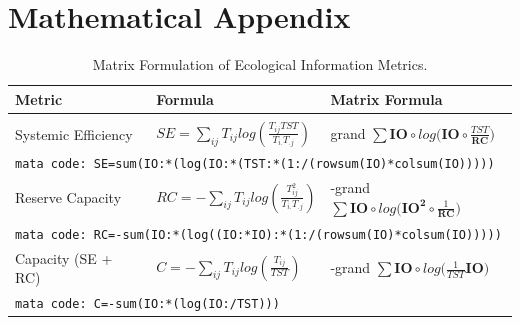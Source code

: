 \documentclass{article}
\begin{document}
\section*{Mathematical Appendix}
\begin{table}[H]
\caption{Matrix Formulation of Ecological Information Metrics.}
\label{IOmetrics_matrix}
\vskip 0.15in
\begin{sc}
\begin{center}
\begin{tabular}{ l l l }
\hline

Metric &  Formula & Matrix Formula \\
\hline
& & \\
Systemic Efficiency
  & $SE = \displaystyle\sum_{ij}{T_{ij}}
  log(\frac{T_{ij}TST}{T_{i.}T_{.j}}) $ 
  & grand $\displaystyle\sum  \mathbf{IO} \circ 
  log\bigg(\mathbf{IO} \circ  \frac{TST}{\mathbf{R}\mathbf{C}}
  \bigg)$ \\[.25in]
  
  \multicolumn{3}{l}{\hspace{.5in} \texttt{mata code:
  SE=sum(IO:*(log(IO:*(TST:*(1:/(rowsum(IO)*colsum(IO)))))}} \\[.5in]

Reserve Capacity 
  & $RC = - \displaystyle\sum_{ij}{T_{ij}} log(\frac{T_{ij}^2}{T_{i.}T_{.j}}) $ 
  & -grand $\displaystyle\sum  \mathbf{IO} \circ 
  log\bigg(\mathbf{IO^2} \circ  \frac{1}{\mathbf{R} \mathbf{C}} \bigg)$ \\[.25in]
  
\multicolumn{3}{l}{\hspace{.5in} \texttt{mata code:
  RC=-sum(IO:*(log((IO:*IO):*(1:/(rowsum(IO)*colsum(IO)))))}} \\[.5in]
  
Capacity (SE + RC)
  & $C = -\displaystyle\sum_{ij}{T_{ij}} log(\frac{T_{ij}}{TST}) $ 
  & -grand $\displaystyle\sum  \mathbf{IO} \circ 
  log\bigg(\frac{1}{TST} \mathbf{IO}\bigg)$ \\[.25in]
  
\multicolumn{3}{l}{\hspace{.5in} \texttt{mata code:
  C=-sum(IO:*(log(IO:/TST)))}} \\[.5in]
  
\end{tabular}
\end{center}
\end{sc}
\vskip -0.1in
\end{table} 

%
%

\printbibliography
\end{document}
